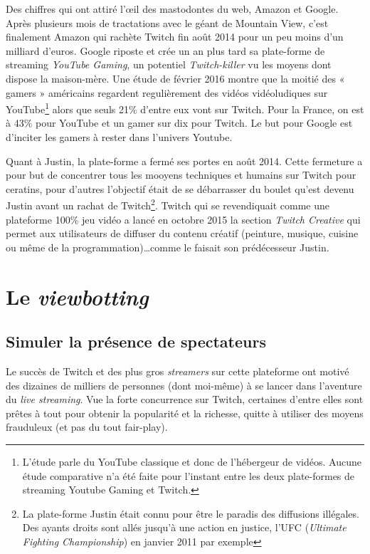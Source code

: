 \documentclass[a4paper]{article}
\begin{document}
Des chiffres qui ont attiré l'\oe{}il des mastodontes du web, Amazon et Google. Après plusieurs mois de tractations avec le géant de Mountain View, c'est finalement Amazon qui rachète Twitch fin août 2014 pour un peu moins d'un milliard d'euros. Google riposte et crée un an plus tard sa plate-forme de streaming \textit{YouTube Gaming}, un potentiel \textit{Twitch-killer} vu les moyens dont dispose la maison-mère\cite{Echos2015}. Une étude de février 2016 montre que la moitié des « gamers » américains regardent regulièrement des vidéos vidéoludiques sur YouTube\footnote{L'étude parle du YouTube classique et donc de l'hébergeur de vidéos. Aucune étude comparative n'a été faite pour l'instant entre les deux plate-formes de streaming Youtube Gaming et Twitch.} alors que seuls 21\% d'entre eux vont sur Twitch. Pour la France, on est à 43\% pour YouTube et un gamer sur dix pour Twitch\cite{Newzoo2016}. Le but pour Google est d'inciter les gamers à rester dans l'univers Youtube.

Quant à Justin, la plate-forme a fermé ses portes en août 2014. Cette fermeture a pour but de concentrer tous les mooyens techniques et humains sur Twitch pour ceratins, pour d'autres l'objectif était de se débarrasser du boulet qu'est devenu Justin avant un rachat de Twitch\footnote{La plate-forme Justin était connu pour être le paradis des diffusions illégales. Des ayants droits sont allés jusqu'à une action en justice, l'UFC (\textit{Ultimate Fighting Championship}) en janvier 2011 par exemple}. Twitch qui se revendiquait comme une plateforme 100\% jeu vidéo a lancé en octobre 2015 la section \textit{Twitch Creative} qui permet aux utilisateurs de diffuser du contenu créatif (peinture, musique, cuisine ou même de la programmation)\ldots comme le faisait son prédécesseur Justin. 
\newpage 
\section{Le \textit{viewbotting}}

\subsection{Simuler la présence de spectateurs}

Le succès de Twitch et des plus gros \textit{streamers} sur cette plateforme ont motivé des dizaines de milliers de personnes (dont moi-même) à se lancer dans l'aventure du \textit{live streaming}. Vue la forte concurrence sur Twitch, certaines d'entre elles sont prêtes à tout pour obtenir la popularité et la richesse, quitte à utiliser des moyens frauduleux (et pas du tout fair-play).
\end{document}
